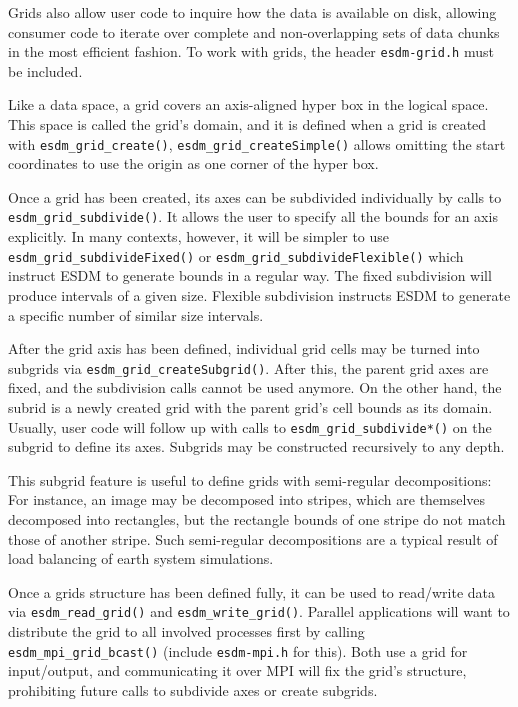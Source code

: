 Grids also allow user code to inquire how the data is available on disk, allowing consumer code to iterate over complete and non-overlapping sets of data chunks in the most efficient fashion.
To work with grids, the header \lstinline|esdm-grid.h| must be included.

Like a data space, a grid covers an axis-aligned hyper box in the logical space. 
This space is called the grid's domain, and it is defined when a grid is created with \lstinline|esdm_grid_create()|, \lstinline|esdm_grid_createSimple()| allows omitting the start coordinates to use the origin as one corner of the hyper box.

Once a grid has been created, its axes can be subdivided individually by calls to \lstinline|esdm_grid_subdivide()|. 
It allows the user to specify all the bounds for an axis explicitly. 
In many contexts, however, it will be simpler to use \lstinline|esdm_grid_subdivideFixed()| or \lstinline|esdm_grid_subdivideFlexible()| which instruct ESDM to generate bounds
in a regular way. 
The fixed subdivision will produce intervals of a given size.
Flexible subdivision instructs ESDM to generate a specific number of similar size intervals.

After the grid axis has been defined, individual grid cells may be turned into subgrids via \lstinline|esdm_grid_createSubgrid()|. 
After this, the parent grid axes are fixed, and the subdivision calls cannot be used anymore. 
On the other hand, the subrid is a newly created grid with the parent grid's cell bounds as its domain. 
Usually, user code will follow up with calls to \lstinline|esdm_grid_subdivide*()| on the subgrid to define its axes. 
Subgrids may be constructed recursively to any depth.

This subgrid feature is useful to define grids with semi-regular decompositions: For instance, an image may be decomposed into stripes, which are themselves decomposed into rectangles, but the rectangle bounds of one stripe do not match those of another stripe. 
Such semi-regular decompositions are a typical result of load balancing of earth system simulations.

Once a grids structure has been defined fully, it can be used to read/write data via \lstinline|esdm_read_grid()| and \lstinline|esdm_write_grid()|.
Parallel applications will want to distribute the grid to all involved processes first by calling \lstinline|esdm_mpi_grid_bcast()| (include \lstinline|esdm-mpi.h| for this). 
Both use a grid for input/output, and communicating it over MPI will fix the grid's structure, prohibiting future calls to subdivide axes or create subgrids.

